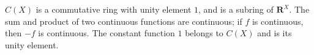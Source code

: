 $C(X)$ is a commutative ring with unity element $1$, and is a subring of $\mathbf{R}^X$.
The sum and product of two continuous functions are continuous; if $f$ is continuous, then $-f$ is continuous.
The constant function $1$ belongs to $C(X)$ and is its unity element.

